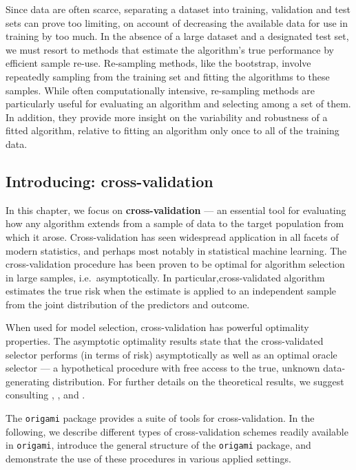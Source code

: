 \documentclass[
  12pt, krantz2,
]{krantz}
\newcommand{\passthrough}[1]{#1}
\newcommand{\1}{\mathbbm{1}}
\theoremstyle{definition}
\theoremstyle{definition}
\theoremstyle{definition}
\theoremstyle{definition}
\theoremstyle{remark}
\begin{document}
Since data are often scarce, separating a dataset into training, validation and
test sets can prove too limiting, on account of decreasing the available data
for use in training by too much. In the absence of a large dataset and a
designated test set, we must resort to methods that estimate the algorithm's
true performance by efficient sample re-use. Re-sampling methods, like the
bootstrap, involve repeatedly sampling from the training set and fitting the
algorithms to these samples. While often computationally intensive, re-sampling
methods are particularly useful for evaluating an algorithm and selecting among
a set of them. In addition, they provide more insight on the variability and
robustness of a fitted algorithm, relative to fitting an algorithm only once to
all of the training data.

\hypertarget{introducing-cross-validation}{%
\subsection{Introducing: cross-validation}\label{introducing-cross-validation}}

In this chapter, we focus on \textbf{cross-validation} --- an essential tool for
evaluating how any algorithm extends from a sample of data to the target
population from which it arose. Cross-validation has seen widespread
application in all facets of modern statistics, and perhaps most notably in
statistical machine learning. The cross-validation procedure has been proven to
be optimal for algorithm selection in large samples, i.e.~asymptotically.
In particular,cross-validated algorithm estimates the true risk when the
estimate is applied to an independent sample from the joint distribution of
the predictors and outcome.

When used for model selection, cross-validation has powerful optimality
properties. The asymptotic optimality results state that the cross-validated
selector performs (in terms of risk) asymptotically as well as an optimal oracle
selector --- a hypothetical procedure with free access to the true, unknown
data-generating distribution. For further details on the theoretical results, we
suggest consulting \citet{vdl2003unified}, \citet{vdl2004asymptotic}, \citet{dudoit2005asymptotics}
and \citet{vaart2006oracle}.

The \passthrough{\lstinline!origami!} package provides a suite of tools for cross-validation. In the
following, we describe different types of cross-validation schemes readily
available in \passthrough{\lstinline!origami!}, introduce the general structure of the \passthrough{\lstinline!origami!}
package, and demonstrate the use of these procedures in various applied
settings.
\end{document}
